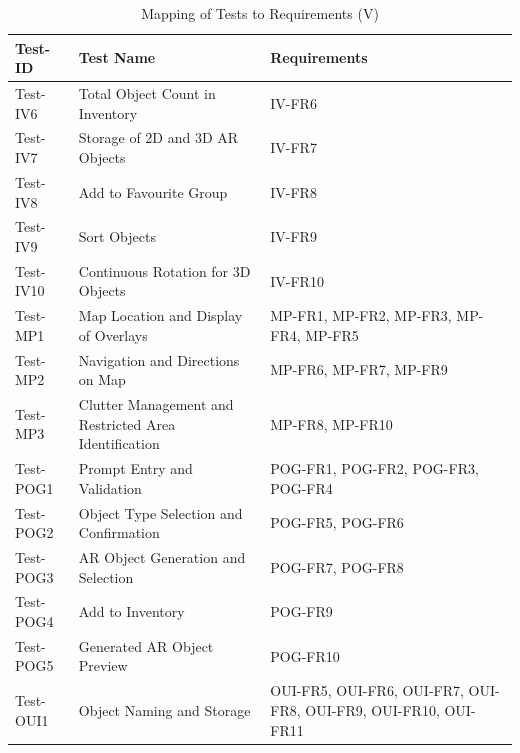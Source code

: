 \documentclass[12pt, titlepage]{article}
\begin{document}
\begin{table}[htpb!]
  \centering
  \begin{tabular}{|l|p{8cm}|p{3cm}|}
    \hline
    \textbf{Test-ID} & \textbf{Test Name}                                    & \textbf{Requirements}                                           \\
    \hline
    Test-IV6         & Total Object Count in Inventory                       & IV-FR6                                                          \\
    \hline
    Test-IV7         & Storage of 2D and 3D AR Objects                       & IV-FR7                                                          \\
    \hline
    Test-IV8         & Add to Favourite Group                                & IV-FR8                                                          \\
    \hline
    Test-IV9         & Sort Objects                                          & IV-FR9                                                          \\
    \hline
    Test-IV10        & Continuous Rotation for 3D Objects                    & IV-FR10                                                         \\
    \hline
    Test-MP1         & Map Location and Display of Overlays                  & MP-FR1, MP-FR2, MP-FR3, MP-FR4, MP-FR5                          \\
    \hline
    Test-MP2         & Navigation and Directions on Map                      & MP-FR6, MP-FR7, MP-FR9                                          \\
    \hline
    Test-MP3         & Clutter Management and Restricted Area Identification & MP-FR8, MP-FR10                                                 \\
    \hline
    Test-POG1        & Prompt Entry and Validation                           & POG-FR1, POG-FR2, POG-FR3, POG-FR4                              \\
    \hline
    Test-POG2        & Object Type Selection and Confirmation                & POG-FR5, POG-FR6                                                \\
    \hline
    Test-POG3        & AR Object Generation and Selection                    & POG-FR7, POG-FR8                                                \\
    \hline
    Test-POG4        & Add to Inventory                                      & POG-FR9                                                         \\
    \hline
    Test-POG5        & Generated AR Object Preview                           & POG-FR10                                                        \\
    \hline
    Test-OUI1        & Object Naming and Storage                             & OUI-FR5, OUI-FR6, OUI-FR7, OUI-FR8, OUI-FR9, OUI-FR10, OUI-FR11 \\
    \hline
  \end{tabular}
  \caption{Mapping of Tests to Requirements (V)}
  \label{tab:test_requirements5}
\end{table}
\end{document}
